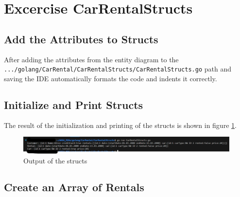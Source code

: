 \section{Excercise CarRentalStructs}
\label{sec:car_rental_structs}

\subsection*{Add the Attributes to Structs}
After adding the attributes from the entity diagram to the 
\texttt{.../golang/CarRental/CarRentalStructs/CarRentalStructs.go} path and saving
the IDE automatically formats the code and indents it correctly.

\subsection*{Initialize and Print Structs}
The result of the initialization and printing of the structs is shown in figure \ref{fig:car_rental_structs}.
\begin{figure}[H]
    \centering
    \includegraphics[width=\textwidth]{figures/goLang/carRental/carRental_structs.png}
    \caption{Output of the structs}
    \label{fig:car_rental_structs}
\end{figure}

\subsection*{Create an Array of Rentals}

